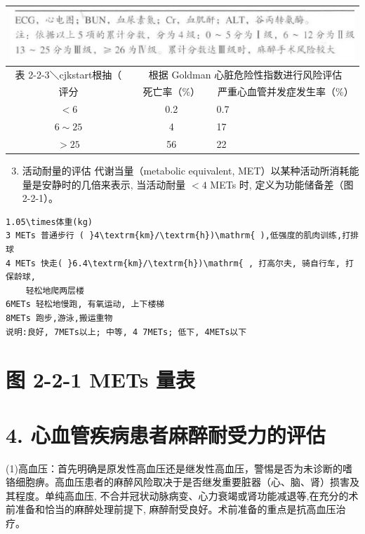 \documentclass[10pt]{article}
\begin{document}
\begin{center}
\begin{tabular}{|c|c|c|c|}
\hline
\multicolumn{4}{|c|}{\includegraphics[max width=\textwidth]{2024_07_05_645bb794a4d4f32ee0c8g-034(1)}
} \\
\hline
表 2-2-3＼cjkstart根抽（ & \multicolumn{3}{|c|}{根据 Goldman 心脏危险性指数进行风险评估} \\
\hline
评分 & 死亡率（\%） & \multicolumn{2}{|c|}{严重心血管并发症发生率（\%）} \\
\hline
$<6$ & 0.2 & \multicolumn{2}{|l|}{0.7} \\
\hline
$6 \sim 25$ & 4 & \multicolumn{2}{|l|}{17} \\
\hline
$>25$ & 56 & \multicolumn{2}{|l|}{22} \\
\hline
\end{tabular}
\end{center}

\begin{enumerate}
  \setcounter{enumi}{2}
  \item 活动耐量的评估 代谢当量（metabolic equivalent, MET）以某种活动所消耗能量是安静时的几倍来表示, 当活动耐量 $<4$ METs 时, 定义为功能储备差（图 2-2-1）。
\end{enumerate}

\begin{verbatim}
1.05\times体重(kg) 
3 METs 普通步行 ( }4\textrm{km}/\textrm{h})\mathrm{ ),低强度的肌肉训练,打排球
4 METs 快走( }6.4\textrm{km}/\textrm{h})\mathrm{ , 打高尔夫, 骑自行车, 打保龄球,
    轻松地爬两层楼
6METs 轻松地慢跑, 有氧运动, 上下楼梯
8METs 跑步,游泳,搬运重物
说明:良好, 7METs以上; 中等, 4 7METs; 低下, 4METs以下
\end{verbatim}

\section*{图 2-2-1 METs 量表}
\section*{4. 心血管疾病患者麻醉耐受力的评估}
(1)高血压：首先明确是原发性高血压还是继发性高血压，警惕是否为未诊断的嗜铬细胞痹。高血压患者的麻醉风险取决于是否继发重要脏器（心、脑、肾）损害及其程度。单纯高血压, 不合并冠状动脉病变、心力衰竭或肾功能减退等,在充分的术前准备和恰当的麻醉处理前提下, 麻醉耐受良好。术前准备的重点是抗高血压治疗。
\end{document}
